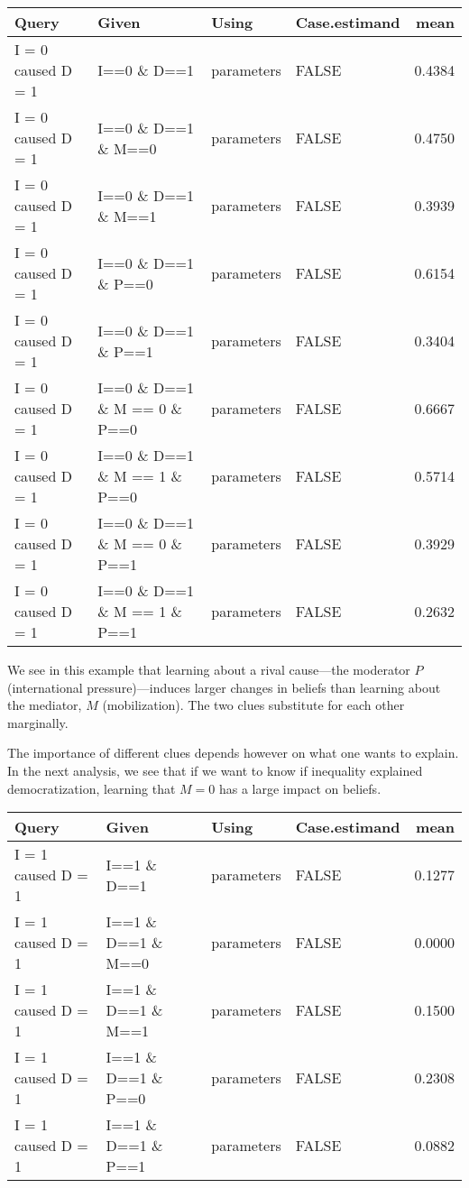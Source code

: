 \documentclass[
  12pt,
]{book}
\begin{document}
\begin{tabular}{l|l|l|l|r}
\hline
Query & Given & Using & Case.estimand & mean\\
\hline
I = 0 caused D = 1 & I==0 \& D==1 & parameters & FALSE & 0.4384\\
\hline
I = 0 caused D = 1 & I==0 \& D==1 \& M==0 & parameters & FALSE & 0.4750\\
\hline
I = 0 caused D = 1 & I==0 \& D==1 \& M==1 & parameters & FALSE & 0.3939\\
\hline
I = 0 caused D = 1 & I==0 \& D==1 \& P==0 & parameters & FALSE & 0.6154\\
\hline
I = 0 caused D = 1 & I==0 \& D==1 \& P==1 & parameters & FALSE & 0.3404\\
\hline
I = 0 caused D = 1 & I==0 \& D==1 \& M == 0 \& P==0 & parameters & FALSE & 0.6667\\
\hline
I = 0 caused D = 1 & I==0 \& D==1 \& M == 1 \& P==0 & parameters & FALSE & 0.5714\\
\hline
I = 0 caused D = 1 & I==0 \& D==1 \& M == 0 \& P==1 & parameters & FALSE & 0.3929\\
\hline
I = 0 caused D = 1 & I==0 \& D==1 \& M == 1 \& P==1 & parameters & FALSE & 0.2632\\
\hline
\end{tabular}

We see in this example that learning about a rival cause---the moderator \(P\) (international pressure)---induces larger changes in beliefs than learning about the mediator, \(M\) (mobilization). The two clues substitute for each other marginally.

The importance of different clues depends however on what one wants to explain. In the next analysis, we see that if we want to know if inequality explained democratization, learning that \(M=0\) has a large impact on beliefs.

\begin{tabular}{l|l|l|l|r}
\hline
Query & Given & Using & Case.estimand & mean\\
\hline
I = 1 caused D = 1 & I==1 \& D==1 & parameters & FALSE & 0.1277\\
\hline
I = 1 caused D = 1 & I==1 \& D==1 \& M==0 & parameters & FALSE & 0.0000\\
\hline
I = 1 caused D = 1 & I==1 \& D==1 \& M==1 & parameters & FALSE & 0.1500\\
\hline
I = 1 caused D = 1 & I==1 \& D==1 \& P==0 & parameters & FALSE & 0.2308\\
\hline
I = 1 caused D = 1 & I==1 \& D==1 \& P==1 & parameters & FALSE & 0.0882\\
\hline
\end{tabular}
\end{document}
